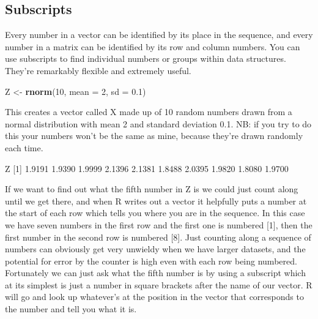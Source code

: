 \documentclass[
]{book}
\newenvironment{Shaded}{\begin{snugshade}}{\end{snugshade}}
\newcommand{\DataTypeTok}[1]{\textcolor[rgb]{0.13,0.29,0.53}{#1}}
\newcommand{\DecValTok}[1]{\textcolor[rgb]{0.00,0.00,0.81}{#1}}
\newcommand{\FloatTok}[1]{\textcolor[rgb]{0.00,0.00,0.81}{#1}}
\newcommand{\KeywordTok}[1]{\textcolor[rgb]{0.13,0.29,0.53}{\textbf{#1}}}
\newcommand{\NormalTok}[1]{#1}
\newcommand{\StringTok}[1]{\textcolor[rgb]{0.31,0.60,0.02}{#1}}
\begin{document}
\hypertarget{subscripts}{%
\subsection{Subscripts}\label{subscripts}}

Every number in a vector can be identified by its place in the sequence, and every number in a matrix can be identified by its row and column numbers. You can use subscripts to find individual numbers or groups within data structures. They're remarkably flexible and extremely useful.

\begin{Shaded}
\begin{Highlighting}[]
\NormalTok{Z  <-}\StringTok{  }\KeywordTok{rnorm}\NormalTok{(}\DecValTok{10}\NormalTok{, }\DataTypeTok{mean =} \DecValTok{2}\NormalTok{, }\DataTypeTok{sd =} \FloatTok{0.1}\NormalTok{)}
\end{Highlighting}
\end{Shaded}

This creates a vector called X made up of 10 random numbers drawn from a normal distribution with mean 2 and standard deviation 0.1. NB: if you try to do this your numbers won't be the same as mine, because they're drawn randomly each time.

\begin{Shaded}
\begin{Highlighting}[]
\NormalTok{Z}
\NormalTok{ [}\DecValTok{1}\NormalTok{] }\FloatTok{1.9191} \FloatTok{1.9390} \FloatTok{1.9999} \FloatTok{2.1396} \FloatTok{2.1381} \FloatTok{1.8488} \FloatTok{2.0395} \FloatTok{1.9820} \FloatTok{1.8080} \FloatTok{1.9700}
\end{Highlighting}
\end{Shaded}

If we want to find out what the fifth number in Z is we could just count along until we get there, and when R writes out a vector it helpfully puts a number at the start of each row which tells you where you are in the sequence. In this case we have seven numbers in the first row and the first one is numbered {[}1{]}, then the first number in the second row is numbered {[}8{]}. Just counting along a sequence of numbers can obviously get very unwieldy when we have larger datasets, and the potential for error by the counter is high even with each row being numbered. Fortunately we can just ask what the fifth number is by using a subscript which at its simplest is just a number in square brackets after the name of our vector. R will go and look up whatever's at the position in the vector that corresponds to the number and tell you what it is.
\end{document}
